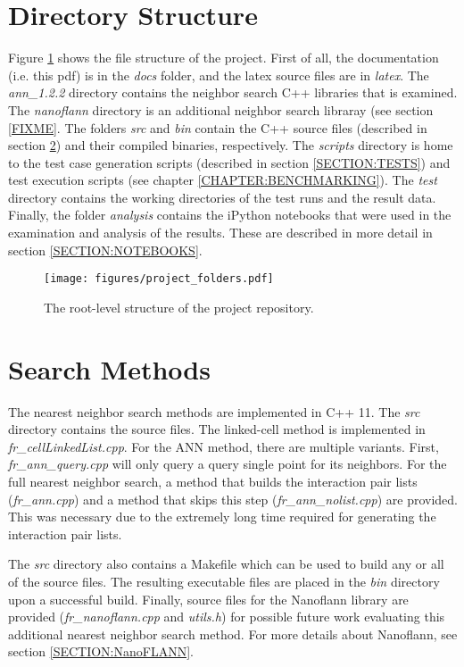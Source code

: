 \section{Directory Structure}
Figure \ref{FIG:folders} shows the file structure of the project.  First of all, the documentation (i.e.  this pdf) is in the {\itshape docs} folder, and the latex source files are in {\itshape latex}. The {\itshape ann\_1.2.2} directory contains the neighbor search C++ libraries that is examined. The {\itshape nanoflann} directory is an additional neighbor search libraray (see section \ref{FIXME}.  The folders {\itshape src} and {\itshape bin} contain the C++ source files (described in section \ref{SECTION:SRC}) and their compiled binaries, respectively.  The {\itshape scripts} directory is home to the test case generation scripts (described in section \ref{SECTION:TESTS}) and test execution scripts (see chapter \ref{CHAPTER:BENCHMARKING}).  The {\itshape test} directory contains the working directories of the test runs and the result data.   Finally, the folder {\itshape analysis} contains the iPython notebooks that were used in the examination and analysis of the results.  These are described in more detail in section \ref{SECTION:NOTEBOOKS}.

\begin{figure}[h]
	\centering
	\texttt{[image: figures/project\_folders.pdf]}
	\caption{The root-level structure of the project repository.}
      \label{FIG:folders}
\end{figure}

\section{Search Methods}
\label{SECTION:SRC}

The nearest neighbor search methods are implemented in C++ 11. The {\itshape src} directory contains the source files. The linked-cell method is implemented in {\itshape fr\_cellLinkedList.cpp}. For the ANN method, there are multiple variants. First, {\itshape fr\_ann\_query.cpp} will only query a query single point for its neighbors. For the full nearest neighbor search, a method that builds the interaction pair lists ({\itshape fr\_ann.cpp}) and a method that skips this step ({\itshape fr\_ann\_nolist.cpp}) are provided. This was necessary due to the extremely long time required for generating the interaction pair lists.

The {\itshape src} directory also contains a Makefile which can be used to build any or all of the source files. The resulting executable files are placed in the {\itshape bin} directory upon a successful build. Finally, source files for the Nanoflann library are provided ({\itshape fr\_nanoflann.cpp} and {\itshape utils.h}) for possible future work evaluating this additional  nearest neighbor search method. For more details about Nanoflann, see section \ref{SECTION:NanoFLANN}.

